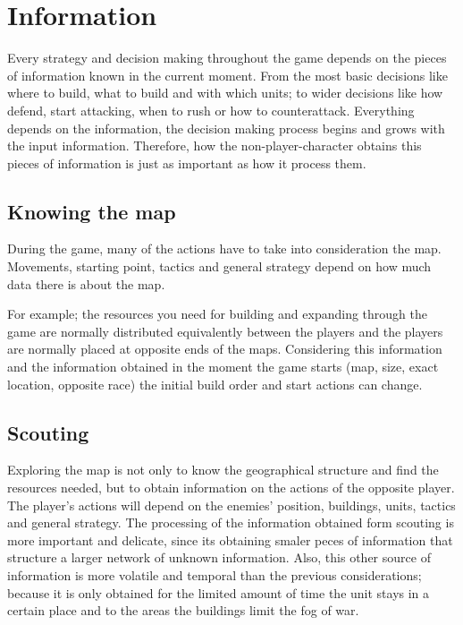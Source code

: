 \section{Information}

Every strategy and decision making throughout the game depends on the pieces of information 
known in the current moment. From the most basic decisions like where to build, what to build and
with which units; to wider decisions like how defend, start attacking, when to rush or how to counterattack.
Everything depends on the information, the decision making process begins and grows with the input information.
Therefore, how the non-player-character obtains this pieces of information is just as important 
as how it process them. 

\subsection{Knowing the map}
During the game, many of the actions have to take into consideration the map. Movements, starting point, 
tactics and general strategy depend on how much data there is about the map.  

For example; the resources you need for building and expanding through the game are normally distributed
equivalently between the players and the players are normally placed at opposite ends of the maps. 
Considering this information and the information obtained in the moment the game starts 
(map, size, exact location, opposite race) the initial build order and start actions can change. 


\subsection{Scouting}

Exploring the map is not only to know the geographical structure and find the resources needed, 
but to obtain information on the actions of the opposite player. The player's actions will depend on
the enemies' position, buildings, units, tactics and general strategy. The processing of the information 
obtained form scouting is more important and delicate, since its obtaining smaler peces of information 
that structure a larger network of unknown information. Also, this other source of information 
is more volatile and temporal than the previous considerations; because it is only obtained for the 
limited amount of time the unit stays in a certain place and to the areas the buildings limit the fog of war. 


